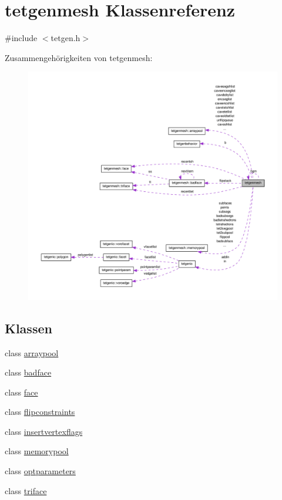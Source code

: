 \hypertarget{classtetgenmesh}{\section{tetgenmesh Klassenreferenz}
\label{classtetgenmesh}
}


{\ttfamily \#include $<$tetgen.\-h$>$}



Zusammengehörigkeiten von tetgenmesh\-:\nopagebreak
\begin{figure}[H]
\begin{center}
\leavevmode
\includegraphics[width=350pt]{classtetgenmesh__coll__graph}
\end{center}
\end{figure}
\subsection*{Klassen}
\begin{DoxyCompactItemize}
\item 
class \hyperlink{classtetgenmesh_1_1arraypool}{arraypool}
\item 
class \hyperlink{classtetgenmesh_1_1badface}{badface}
\item 
class \hyperlink{classtetgenmesh_1_1face}{face}
\item 
class \hyperlink{classtetgenmesh_1_1flipconstraints}{flipconstraints}
\item 
class \hyperlink{classtetgenmesh_1_1insertvertexflags}{insertvertexflags}
\item 
class \hyperlink{classtetgenmesh_1_1memorypool}{memorypool}
\item 
class \hyperlink{classtetgenmesh_1_1optparameters}{optparameters}
\item 
class \hyperlink{classtetgenmesh_1_1triface}{triface}
\end{DoxyCompactItemize}
